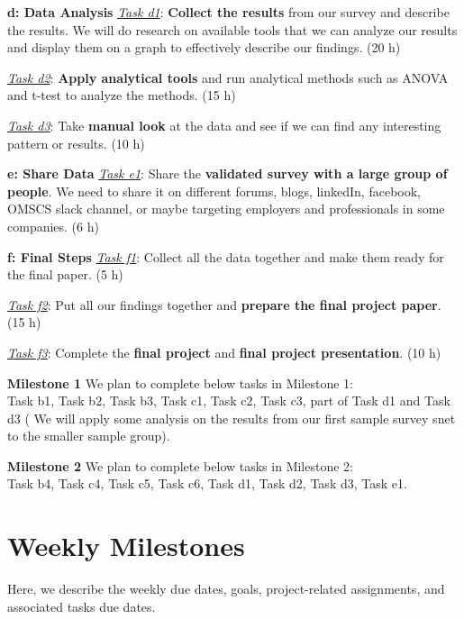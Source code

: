 \documentclass{sigchi}
\begin{document}
\textbf{d: Data Analysis}\newline
\textit{\underline{Task d1}}: \textbf{Collect the results} from our survey and describe the results. We will do research on available tools that we can analyze our results and display them on a graph to effectively describe our findings. (20 h)

\textit{\underline{Task d2}}: \textbf{Apply analytical tools} and run analytical methods such as ANOVA and t-test to analyze the methods. (15 h)

\textit{\underline{Task d3}}: Take \textbf{manual look} at the data and see if we can find any interesting pattern or results. (10 h)\newline

\textbf{e: Share Data}\newline
\textit{\underline{Task e1}}: Share the \textbf{validated survey with a large group of people}. We need to share it on different forums, blogs, linkedIn, facebook, OMSCS slack channel, or maybe targeting employers and professionals in some companies. (6 h)\newline

\textbf{f: Final Steps}\newline
\textit{\underline{Task f1}}: Collect all the data together and make them ready for the final paper. (5 h)

\textit{\underline{Task f2}}: Put all our findings together and \textbf{prepare the final project paper}. (15 h)

\textit{\underline{Task f3}}: Complete the \textbf{final project} and \textbf{final project presentation}.  (10 h)\newline

\textbf{Milestone 1}\newline
We plan to complete below tasks in Milestone 1:\\
Task b1, Task b2, Task b3, Task c1, Task c2, Task c3, part of Task d1 and Task d3 ( We will apply some analysis on the results from our first sample survey snet to the smaller sample group).

\textbf{Milestone 2}\newline
We plan to complete below tasks in Milestone 2:\\
Task b4, Task c4, Task c5, Task c6, Task d1, Task d2, Task d3, Task e1.

\section{Weekly Milestones}
Here, we describe the weekly due dates, goals, project-related assignments, and associated tasks due dates.
\end{document}
